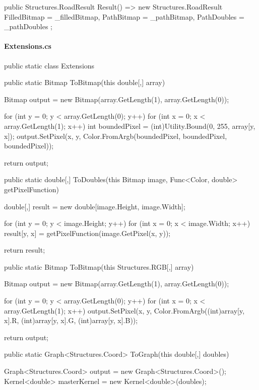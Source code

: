 \begin{flushleft}
\begin{cscode}
{    public Structures.RoadResult Result() => new Structures.RoadResult
    {
        FilledBitmap = _filledBitmap,
        PathBitmap = _pathBitmap,
        PathDoubles = _pathDoubles
    };
}
    \end{cscode}
\pagebreak
    
    
    \paragraph{Extensions.cs}
    \begin{cscode}
public static class Extensions
{
    public static Bitmap ToBitmap(this double[,] array)
    {
        Bitmap output = new Bitmap(array.GetLength(1), array.GetLength(0));

        for (int y = 0; y < array.GetLength(0); y++)
        {
            for (int x = 0; x < array.GetLength(1); x++)
            {
                int boundedPixel = (int)Utility.Bound(0, 255, array[y, x]);
                output.SetPixel(x, y, Color.FromArgb(boundedPixel, boundedPixel, boundedPixel));
            }
        }

        return output;
    }

    public static double[,] ToDoubles(this Bitmap image, Func<Color, double> getPixelFunction)
    {
        double[,] result = new double[image.Height, image.Width];

        for (int y = 0; y < image.Height; y++)
        {
            for (int x = 0; x < image.Width; x++)
            {
                result[y, x] = getPixelFunction(image.GetPixel(x, y));
            }
        }

        return result;
    }

    public static Bitmap ToBitmap(this Structures.RGB[,] array)
    {
        Bitmap output = new Bitmap(array.GetLength(1), array.GetLength(0));

        for (int y = 0; y < array.GetLength(0); y++)
        {
            for (int x = 0; x < array.GetLength(1); x++)
            {
                output.SetPixel(x, y, Color.FromArgb((int)array[y, x].R, (int)array[y, x].G, (int)array[y, x].B));
            }
        }

        return output;
    }

    public static Graph<Structures.Coord> ToGraph(this double[,] doubles)
    {
        Graph<Structures.Coord> output = new Graph<Structures.Coord>();
        Kernel<double> masterKernel = new Kernel<double>(doubles);

}}
\end{cscode}
\end{flushleft}
